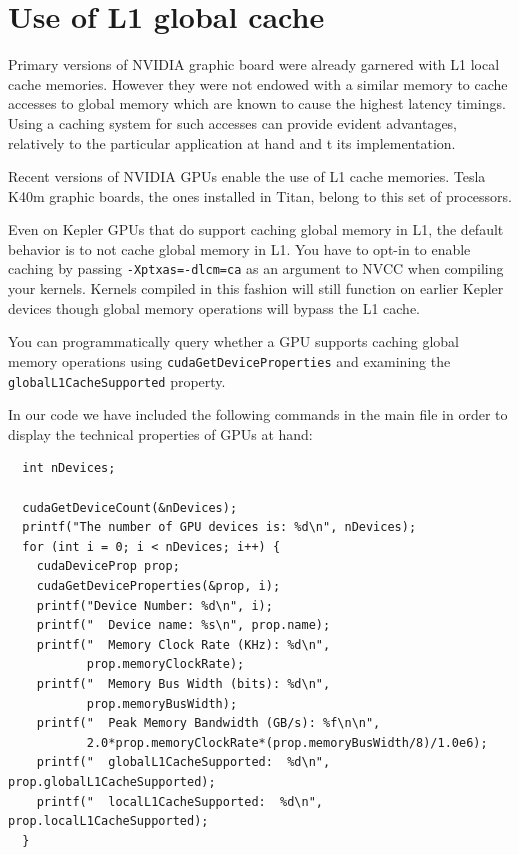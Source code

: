 \documentclass[a4paper,10pt]{article}
\begin{document}
\section{Use of L1 global cache}
Primary versions of NVIDIA graphic board were already garnered with L1 local 
cache memories. However they were not endowed with a similar memory to cache 
accesses to global memory which are known to cause the highest latency timings.
Using a caching system for such accesses can provide evident advantages, 
relatively to the particular application at hand and t its implementation. 


Recent versions of NVIDIA GPUs enable the use of L1 cache memories.
Tesla K40m graphic boards, the ones installed in Titan, belong to this set of 
processors. 

Even on Kepler GPUs that do support caching global memory in L1, the default 
behavior is to not cache global memory in L1. You have to opt-in to enable 
caching by passing \texttt{-Xptxas=-dlcm=ca} as an argument to NVCC when 
compiling your kernels. Kernels compiled in this fashion will still function on 
earlier Kepler devices though global memory operations will bypass the L1 cache.


You can programmatically query whether a GPU supports caching global 
memory operations using \texttt{cudaGetDeviceProperties} and examining the 
\texttt{globalL1CacheSupported} property.


In our code we have included the following commands in the main file in order 
to display the technical properties of GPUs at hand:

\hspace*{-2cm}
\begin{lstlisting}
  int nDevices;

  cudaGetDeviceCount(&nDevices);
  printf("The number of GPU devices is: %d\n", nDevices);
  for (int i = 0; i < nDevices; i++) {
    cudaDeviceProp prop;
    cudaGetDeviceProperties(&prop, i);
    printf("Device Number: %d\n", i);
    printf("  Device name: %s\n", prop.name);
    printf("  Memory Clock Rate (KHz): %d\n",
           prop.memoryClockRate);
    printf("  Memory Bus Width (bits): %d\n",
           prop.memoryBusWidth);
    printf("  Peak Memory Bandwidth (GB/s): %f\n\n",
           2.0*prop.memoryClockRate*(prop.memoryBusWidth/8)/1.0e6);
    printf("  globalL1CacheSupported:  %d\n", prop.globalL1CacheSupported);
    printf("  localL1CacheSupported:  %d\n", prop.localL1CacheSupported);
  }
\end{lstlisting}
\end{document}
